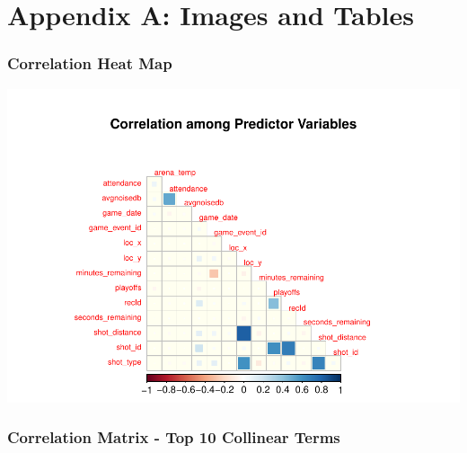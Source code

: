\documentclass[american,]{article}
\begin{document}
\newpage

\hypertarget{appendix-a-images-and-tables}{%
\section{Appendix A: Images and Tables}\label{appendix-a-images-and-tables}}

\hypertarget{correlation-heat-map}{%
\subsubsection{Correlation Heat Map}\label{correlation-heat-map}}

\includegraphics{Final_Project_Applied_JN2_files/figure-latex/Heatmap for Appendix-1.pdf}

\hypertarget{correlation-matrix---top-10-collinear-terms}{%
\subsubsection{Correlation Matrix - Top 10 Collinear Terms}\label{correlation-matrix---top-10-collinear-terms}}
\end{document}
